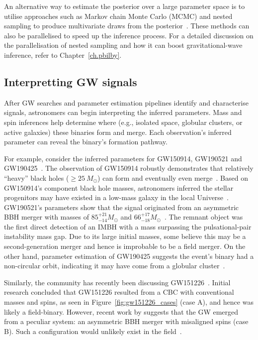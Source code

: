 An alternative way to estimate the posterior over a large parameter space is to utilise approaches such as Markov chain Monte Carlo (MCMC) and nested sampling to produce multivariate draws from the posterior~\cite{bilby_paper, bilby_gwtc, dynesty_paper, skilling2004, skilling2006}. 
These methods can also be parallelised to speed up the inference process. 
For a detailed discussion on the parallelisation of nested sampling and how it can boost gravitational-wave inference, refer to Chapter~\ref{ch.pbilby}. 


\subsection{Interpretting GW signals}

After GW searches and parameter estimation pipelines identify and characterise signals, astronomers can begin interpreting the inferred parameters.
Mass and spin inferences help determine where (e.g., isolated space, globular clusters, or active galaxies) these binaries form and merge.
Each observation's inferred parameter can reveal the binary's formation pathway.


For example, consider the inferred parameters for GW150914, GW190521 and GW190425~\cite{abbott2016observation, gw190521,gw190425}. 
The observation of GW150914 robustly demonstrates that relatively ``heavy'' black holes ($\geq25\ M_{\odot}$) can form and eventually even merge~\cite{gw150914_asto_implications}.
Based on GW150914's component black hole masses, astronomers inferred the stellar progenitors may have existed in a low-mass galaxy in the local Universe~\cite{gw150914_asto_implications}. 
GW190521's parameters show that the signal originated from an asymmetric BBH merger with masses of $85^{+21}_{-14}M_{\odot}$ and $66^{+17}_{-18}M_{\odot}$~\cite{gw190521}.
The remnant object was the first direct detection of an IMBH with a mass surpassing the pulsational-pair instability mass gap.
Due to its large initial masses, some believe this may be a second-generation merger and hence is improbable to be a field merger. 
On the other hand,  parameter estimation of GW190425 suggests the event's binary had a non-circular orbit, indicating it may have come from a globular cluster~\cite{Romero-Shaw:2020:MNRAS}.

Similarly, the community has recently been discussing GW151226~\cite{Chia:2022:PhRvD, Mateu-Lucena:2021:arXiv, Nitz:2021:ApJ}. 
Initial research concluded that GW151226 resulted from a CBC with conventional masses and spins, as seen in Figure~\ref{fig:gw151226_cases} (case A), and hence was likely a field-binary.
However, recent work by \citet{Chia:2022:PhRvD} suggests that the GW emerged from a peculiar system: an asymmetric BBH merger with misaligned  spins (case B). Such a configuration would unlikely exist in the field~\cite{Chia:2022:PhRvD}.

